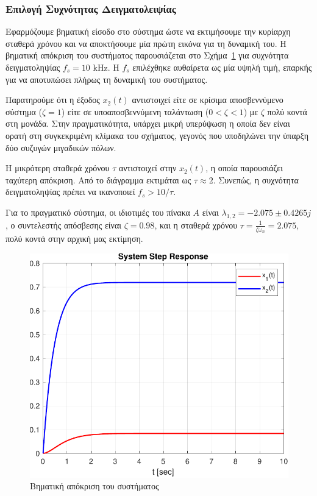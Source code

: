 \documentclass[a4paper,12pt]{article}
\begin{document}
\subsubsection*{Επιλογή Συχνότητας Δειγματολειψίας}

Εφαρμόζουμε βηματική είσοδο στο σύστημα ώστε να εκτιμήσουμε την κυρίαρχη σταθερά χρόνου  
και να αποκτήσουμε μία πρώτη εικόνα για τη δυναμική του. Η βηματική απόκριση του συστήματος  
παρουσιάζεται στο Σχήμα~\ref{fig:task1_step_response} για συχνότητα δειγματοληψίας $f_s = 10$
kHz. Η $f_s$ επιλέχθηκε αυθαίρετα ως μία υψηλή τιμή, 
επαρκής για να αποτυπώσει πλήρως τη δυναμική του συστήματος.

Παρατηρούμε ότι η έξοδος $x_2(t)$ αντιστοιχεί είτε σε κρίσιμα αποσβεννύμενο σύστημα ($\zeta = 1$)  
είτε σε υποαποσβεννύμενη ταλάντωση ($0 < \zeta < 1$) με $\zeta$ πολύ κοντά στη μονάδα.  
Στην πραγματικότητα, υπάρχει μικρή υπερύψωση η οποία δεν είναι ορατή στη συγκεκριμένη κλίμακα του 
σχήματος, γεγονός που υποδηλώνει την ύπαρξη δύο συζυγών μιγαδικών πόλων.

Η μικρότερη σταθερά χρόνου $\tau$ αντιστοιχεί στην $x_2(t)$, η οποία παρουσιάζει ταχύτερη  
απόκριση. Από το διάγραμμα εκτιμάται ως $\tau \approx 2$. Συνεπώς, η συχνότητα δειγματοληψίας  
πρέπει να ικανοποιεί $f_s > 10/\tau$.

Για το πραγματικό σύστημα, οι ιδιοτιμές του πίνακα $A$ είναι $\lambda_{1,2} = -2.075 \pm 0.4265j$, 
ο συντελεστής απόσβεσης είναι $\zeta = 0.98$, και η σταθερά χρόνου
$\tau = \frac{1}{\zeta \omega_n} = 2.075$, πολύ κοντά στην αρχική μας εκτίμηση.

\begin{figure}
    \centering
    \includegraphics[width=0.75\linewidth]{plot/task1_step_response.pdf}
    \caption{Βηματική απόκριση του συστήματος}
    \label{fig:task1_step_response}
\end{figure}
\end{document}
